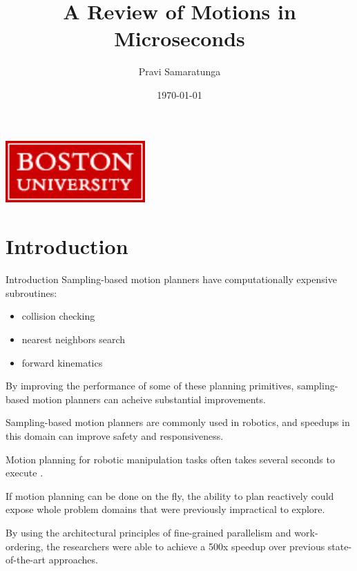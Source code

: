 \documentclass{beamer}
\title[]{A Review of Motions in Microseconds}
\author[]{Pravi Samaratunga}
\institute{Boston University ECE}
\date{\today}
\newcommand{\todo}[1]{\textit{\textcolor{red}{#1}}}
\newcommand{\citationneeded}{\textbf{\color{blue}[Citation Needed]}}
\begin{document}
\begin{frame}
   \begin{center}
       \titlepage
     
       \includegraphics[width=0.4\textwidth]{./assets/BU_logo.png}
            
   \end{center}
\end{frame}



\section{Introduction}

\begin{frame}[allowframebreaks]{Introduction}
Sampling-based motion planners have computationally expensive subroutines:
\begin{itemize}\item collision checking \item nearest neighbors search \item forward kinematics\end{itemize}

By improving the performance of some of these planning primitives, sampling-based motion planners can acheive substantial improvements. 

Sampling-based motion planners are commonly used in robotics, and speedups in this domain can improve safety and responsiveness. 

Motion planning for robotic manipulation tasks often takes several seconds to execute \cite{paper:MiM}. 

If motion planning can be done on the fly, the ability to plan reactively could expose whole problem domains that were previously impractical to explore. %

By using the architectural principles of fine-grained parallelism and work-ordering, the researchers were able to achieve a 500x speedup over previous state-of-the-art approaches.
\end{frame}
\end{document}
